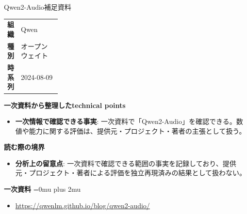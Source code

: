 \begin{technicalnote}{Qwen2-Audio}{補足資料}
\begingroup
\begin{tabularx}{\linewidth}{@{}>{\bfseries}p{0.22\linewidth}X@{}}
組織 & Qwen \\
種別 & オープンウェイト \\
時系列 & 2024-08-09 \\
\end{tabularx}
\smallskip
{\bfseries 一次資料から整理したtechnical points}
\begin{itemize}[leftmargin=1.5em,itemsep=0.35em]
\item \textbf{一次情報で確認できる事実}: 一次資料で「Qwen2-Audio」を確認できる。数値や能力に関する評価は、提供元・プロジェクト・著者の主張として扱う。
\end{itemize}
\begin{minipage}{\linewidth}
{\bfseries 読む際の境界}
\begin{itemize}[leftmargin=1.5em,itemsep=0.35em]
\item \textbf{分析上の留意点}: 一次資料で確認できる範囲の事実を記録しており、提供元・プロジェクト・著者による評価を独立再現済みの結果として扱わない。
\end{itemize}
\begin{samepage}
{\bfseries 一次資料}
\begingroup\sloppy
\Urlmuskip=0mu plus 2mu\relax
\begin{itemize}[leftmargin=1.5em,itemsep=0.25em]
\item {\scriptsize\url{https://qwenlm.github.io/blog/qwen2-audio/}}
\end{itemize}
\endgroup
\end{samepage}
\end{minipage}
\endgroup
\end{technicalnote}
\medskip

